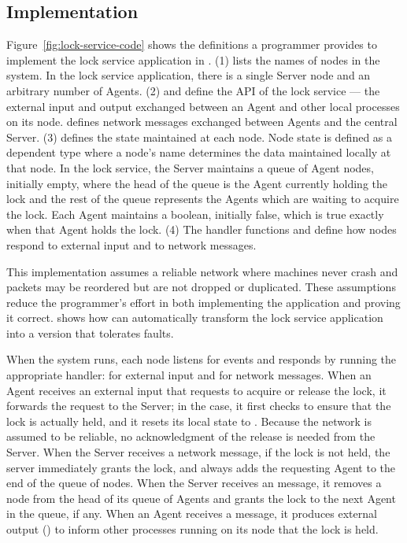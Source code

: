 \subsection{Implementation}

Figure~\ref{fig:lock-service-code} shows the definitions a programmer
provides to implement the lock service application in \Verdi.
%
(1) \Name lists the names of nodes in the system.
%
In the lock service application, there is a single Server node and an
arbitrary number of Agents.
%
(2) \Input and \Output define the API of the lock service --- the external
input and output exchanged between an Agent and other local processes on
its node.
%
\Message defines network messages exchanged between Agents and the central
Server.
%
(3) \VerdiState defines the state maintained at each node.
Node state is defined as a dependent type where a node's name determines
the data maintained locally at that node.
%
In the lock service, the Server maintains a queue of Agent nodes,
initially empty, where the head of the queue is the Agent currently
holding the lock and the rest of the queue represents the Agents which
are waiting to acquire the lock.
%
Each Agent maintains a boolean, initially false, which is true exactly when
that Agent holds the lock.
%
(4) The handler functions \HandleInput and \HandleMessage define how
nodes respond to external input and to network messages.

This implementation assumes a reliable network where machines never crash
and packets may be reordered but are not dropped or duplicated.
%
These assumptions reduce the programmer's effort in both implementing the
application and proving it correct.
%
 shows how \Verdi can automatically transform
the lock service application into a version that tolerates faults.

When the system runs, each node listens for events and responds by running
the appropriate handler: \HandleInput for external input and \HandleMessage
for network messages.
%
%
When an Agent receives an external input that requests to acquire or
release the lock, it forwards the request to the Server; in the \UnlockIO
case, it first checks to ensure that the lock is actually held, and it
resets its local state to .
Because the network is assumed to be reliable, no acknowledgment
of the release is needed from the Server.
%
%
%
When the Server receives a \LockMsg network message, if the lock is not
held, the server immediately grants the lock, and always adds the
requesting Agent to the end of the queue of nodes.
%
When the Server receives an \UnlockMsg message, it removes a node from the
head of its queue of Agents and grants the lock to the next Agent in the
queue, if any.
%
When an Agent receives a \GrantMsg message, it produces external output
(\GrantIO) to inform other processes running on its node that the lock is
held.

